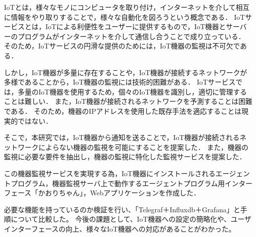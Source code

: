 IoTとは，様々なモノにコンピュータを取り付け，インターネットを介して相互に情報をやり取りすることで，様々な自動化を図ろうという概念である．
IoTサービスとは，IoTによる利便性をユーザーに提供するもので，IoT機器とサーバーのプログラムがインターネットを介して通信し合うことで成り立っている．
そのため，IoTサービスの円滑な提供のためには，IoT機器の監視は不可欠である．
\medskip

しかし，IoT機器が多量に存在することや，IoT機器が接続するネットワークが多様であることから，IoT機器の監視には技術的困難がある．
IoTサービスでは，多量のIoT機器を使用するため，個々のIoT機器を識別し，適切に管理することは難しい．
また，IoT機器が接続されるネットワークを予測することは困難である．
そのため，機器のIPアドレスを使用した既存手法を適応することは現実的ではない．
\medskip

そこで，本研究では，IoT機器から通知を送ることで，IoT機器が接続されるネットワークによらない機器の監視を可能にすることを提案した．
また，機器の監視に必要な要件を抽出し，機器の監視に特化した監視サービスを提案した．
\medskip

この機器監視サービスを実現する為，IoT機器にインストールされるエージェントプログラム，機器監視サーバ上で動作するエージェントプログラム用インターフェース「かおりちゃん」，Webアプリケーションを作成した．
\medskip

必要な機能を持っているのか検証を行い、「Telegraf＋Influxdb＋Grafana」と手順について比較した。
今後の課題として、IoT機器への設定の簡略化や、ユーザインターフェースの向上、様々なIoT機器への対応があることがわかった。



